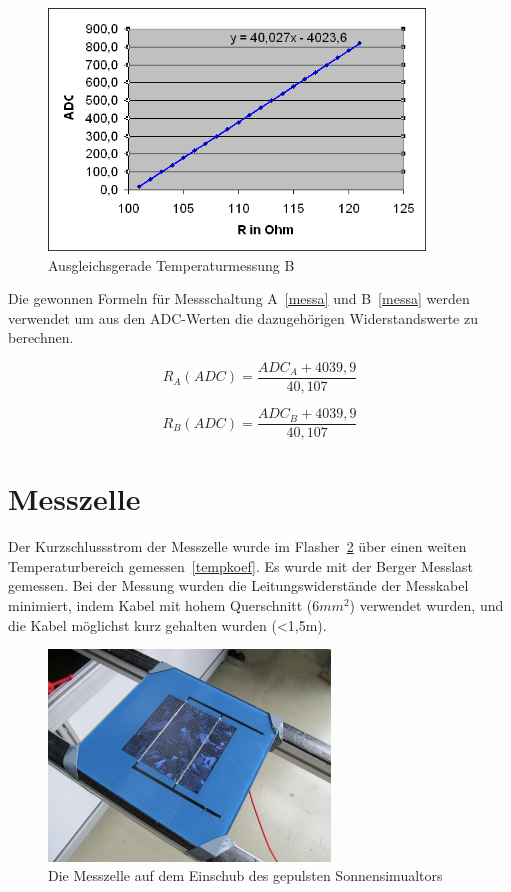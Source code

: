 \documentclass[a4paper,bibtotoc,oneside]{scrbook}
\begin{document}
\begin{figure}[htbp]
\centering
\includegraphics[width=100mm]{img/messb.png}
\caption{Ausgleichsgerade Temperaturmessung B}\label{messb}
\end{figure}

Die gewonnen Formeln für Messschaltung A~\ref{messa} und B~\ref{messa} werden verwendet um aus den ADC-Werten die dazugehörigen Widerstandswerte zu berechnen. 

  \begin{equation}
     R_A(ADC) = \frac{ADC_A + 4039,9}{40,107}
  \end{equation}
  
    \begin{equation}
     R_B(ADC) = \frac{ADC_B + 4039,9}{40,107}
  \end{equation}


\section{Messzelle}\thispagestyle{empty}


Der Kurzschlussstrom der Messzelle wurde im Flasher~\ref{zelleflasher} über einen weiten Temperaturbereich gemessen~\ref{tempkoef}. Es wurde mit der Berger Messlast gemessen. Bei der Messung wurden die Leitungswiderstände der Messkabel minimiert, indem Kabel mit hohem Querschnitt ($6mm^2$) verwendet wurden, und die Kabel möglichst kurz gehalten wurden (<1,5m).
 
\begin{figure}[htbp]
\centering
\includegraphics[width=75mm]{img/zelle.jpg}
\caption{Die Messzelle auf dem Einschub des gepulsten Sonnensimualtors}\label{zelleflasher}
\end{figure}
\end{document}
